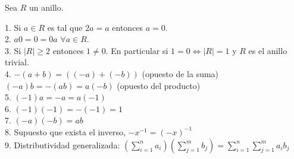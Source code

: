 \begin{proposition}
Sea $R$ un anillo.

1. Si $a \in R$ es tal que $2a = a$ entonces $a = 0$.\\
2. $a0 = 0 = 0a$ $\forall a \in R$.\\
3. Si $|R| \ge 2$ entonces $1 \neq 0$. En particular si $1 = 0 \iff |R| = 1$ y $R$ es el anillo trivial. \\
4. $-(a+b) = ((-a) + (-b))$ (opuesto de la suma) \\
   $(-a)b = -(ab) = a(-b)$ (opuesto del producto)\\
5. $(-1)a = -a = a(-1)$\\
6. $(-1)(-1) = -(-1) = 1$\\
7. $(-a)(-b) = ab$\\
8. Supuesto que exista el inverso, $-x^{-1} = (-x)^{-1}$ \\
9. Distributividad generalizada: $(\sum_{i=1}^{n} a_i)(\sum_{j=1}^{m}b_j) = \sum_{i=1}^{n}\sum_{j=1}^{m}a_i b_j$
\end{proposition}

